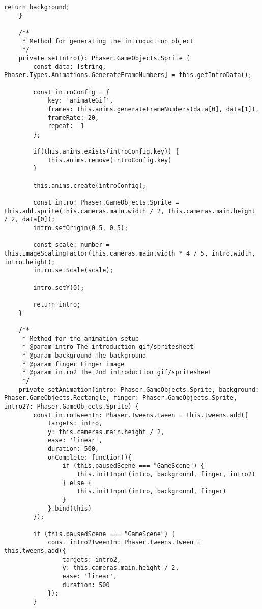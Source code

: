 \begin{lstlisting}[style=TypeScript, caption={introScene.ts}]
        return background;
    }

    /**
     * Method for generating the introduction object
     */
    private setIntro(): Phaser.GameObjects.Sprite {
        const data: [string, Phaser.Types.Animations.GenerateFrameNumbers] = this.getIntroData();

        const introConfig = {
            key: 'animateGif',
            frames: this.anims.generateFrameNumbers(data[0], data[1]),
            frameRate: 20,
            repeat: -1
        };

        if(this.anims.exists(introConfig.key)) {
            this.anims.remove(introConfig.key)
        }

        this.anims.create(introConfig);

        const intro: Phaser.GameObjects.Sprite = this.add.sprite(this.cameras.main.width / 2, this.cameras.main.height / 2, data[0]);
        intro.setOrigin(0.5, 0.5);

        const scale: number = this.imageScalingFactor(this.cameras.main.width * 4 / 5, intro.width, intro.height);
        intro.setScale(scale);

        intro.setY(0);

        return intro;
    }

    /**
     * Method for the animation setup
     * @param intro The introduction gif/spritesheet
     * @param background The background
     * @param finger Finger image
     * @param intro2 The 2nd introduction gif/spritesheet
     */
    private setAnimation(intro: Phaser.GameObjects.Sprite, background: Phaser.GameObjects.Rectangle, finger: Phaser.GameObjects.Sprite, intro2?: Phaser.GameObjects.Sprite) {
        const introTweenIn: Phaser.Tweens.Tween = this.tweens.add({
            targets: intro,
            y: this.cameras.main.height / 2,
            ease: 'linear',
            duration: 500,
            onComplete: function(){
                if (this.pausedScene === "GameScene") {
                    this.initInput(intro, background, finger, intro2)
                } else {
                    this.initInput(intro, background, finger)
                }
            }.bind(this)
        });

        if (this.pausedScene === "GameScene") {
            const intro2TweenIn: Phaser.Tweens.Tween = this.tweens.add({
                targets: intro2,
                y: this.cameras.main.height / 2,
                ease: 'linear',
                duration: 500
            });
        }


\end{lstlisting}
